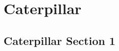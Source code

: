 %
\chapter{Caterpillar}
\label{sec:caterpillar}



\section{Caterpillar Section 1}
\label{sec:caterpillar:sec1}


